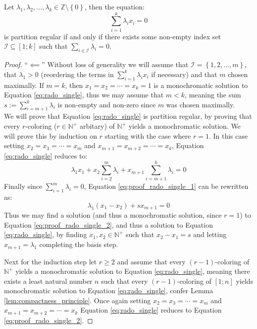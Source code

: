 \begin{theorem}\label{thm:single_eq_rado}
	Let $\lambda_1, \lambda_2, \ldots, \lambda_k \in \mathbb{Z} \setminus \left\{0\right\}$, then the equation:
	\begin{equation}\label{eq:rado_single}
		\sum_{i = 1}^{k} \lambda_{i}x_i = 0
	\end{equation}
	is partition regular if and only if there exists some non-empty index set $\mathcal{I} \subseteq [1; k]$ such that $\sum_{i \in \mathcal{I}} \lambda_i = 0$.
\end{theorem}
\begin{proof}
	``$\impliedby$'' Without loss of generality we will assume that $\mathcal{I} = \left\{1, 2, \ldots, m\right\}$, that $\lambda_1 > 0$ (reordering the terms in $\sum_{i = 1}^{k} \lambda_i x_i$ if necessary) and that $m$ chosen maximally. If $m = k$, then $x_1 = x_2 = \cdots = x_{k} = 1$ is a monochromatic solution to Equation \eqref{eq:rado_single}, thus we may assume that $m < k$, meaning the sum $s := \sum_{i = m + 1}^{k} \lambda_{i}$ is non-empty and non-zero since $m$ was chosen maximally. \\
	We will prove that Equation \eqref{eq:rado_single} is partition regular, by proving that every $r$-coloring ($r \in \mathbb{N}^{+}$ arbitary) of $\mathbb{N}^{+}$ yields a monochromatic solution. We will prove this by induction on $r$ starting with the case where $r = 1$. In this case setting $x_2 = x_3 = \cdots = x_{m}$ and $x_{m + 1} = x_{m + 2} = \cdots = x_{k}$, Equation \eqref{eq:rado_single} reduces to:
	\begin{equation}\label{eq:proof_rado_single_1}
		\lambda_1 x_1 + x_2\sum_{i = 2}^{m} \lambda_i + x_{m + 1} \sum_{i = m + 1}^k \lambda_{i} = 0
	\end{equation}
	Finally since $\sum_{i = 1}^{m} \lambda_i = 0$, Equation \eqref{eq:proof_rado_single_1} can be rewritten as:
	\begin{equation}\label{eq:proof_rado_single_2}
		\lambda_1 (x_1 - x_2) + sx_{m + 1} = 0
	\end{equation}
	Thus we may find a solution (and thus a monochromatic solution, since $r = 1$) to Equation \eqref{eq:proof_rado_single_2}, and thus a solution to Equation \eqref{eq:rado_single}, by finding $x_1, x_2 \in \mathbb{N}^{+}$ such that $x_2 - x_1 = s$ and letting $x_{m + 1} = \lambda_1$ completing the basis step.

	Next for the induction step let $r \geq 2$ and assume that every $(r-1)$-coloring of $\mathbb{N}^{+}$ yields a monochromatic solution to Equation \eqref{eq:rado_single}, meaning there exists a least natural number $n$ such that every $(r-1)$-coloring of $[1; n]$ yields monochromatic solution to Equation \eqref{eq:rado_single}, confer Lemma \ref{lem:compactness_principle}.
	Once again setting $x_2 = x_3 = \cdots = x_{m}$ and $x_{m + 1} = x_{m + 2} = \cdots = x_{k}$ Equation \eqref{eq:rado_single} reduces to Equation \eqref{eq:proof_rado_single_2}.


\end{proof}
